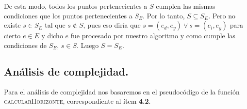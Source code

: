 De esta modo, todos los puntos pertenecientes a $S$ cumplen las mismas
condiciones que los puntos pertenecientes a $S_E$. Por lo tanto, $S
\subseteq S_E$. Pero no existe $s \in S_E$ tal que $s \notin S$, pues eso
diría que $s = (e_d, e_y) \lor s = (e_i, e_y)$ para cierto $e \in E$ y dicho
$e$ fue procesado por nuestro algoritmo y como cumple las condiciones de
$S_E$, $s \in S$. Luego $S = S_E$.


\subsection{Análisis de complejidad.}

\vspace*{0.3cm}

Para el análisis de complejidad nos basaremos en el pseudocódigo de la función
\textsc{calcularHorizonte}, correspondiente al ítem \textbf{4.2}.

